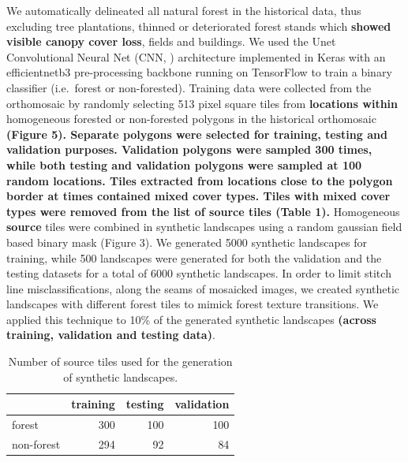 \documentclass[remote sensing,article,submit,moreauthors,pdftex]{mdpi}
\begin{document}
We automatically delineated all natural forest in the historical data,
thus excluding tree plantations, thinned or deteriorated forest stands
which \textbf{showed visible canopy cover loss}, fields and buildings.
We used the Unet Convolutional Neural Net (CNN, \citet{ronneberger2015})
architecture implemented in Keras \citep{chollet2015} with an
efficientnetb3 pre-processing backbone \citep{yakubovskiy2019} running
on TensorFlow \citep{martinabadi2015} to train a binary classifier
(i.e.~forest or non-forested). Training data were collected from the
orthomosaic by randomly selecting 513 pixel square tiles from
\textbf{locations within} homogeneous forested or non-forested polygons
in the historical orthomosaic \textbf{(Figure 5). Separate polygons were
selected for training, testing and validation purposes. Validation
polygons were sampled 300 times, while both testing and validation
polygons were sampled at 100 random locations. Tiles extracted from
locations close to the polygon border at times contained mixed cover
types. Tiles with mixed cover types were removed from the list of source
tiles (Table 1).} Homogeneous \textbf{source} tiles were combined in
synthetic landscapes using a random gaussian field based binary mask
(Figure 3). We generated 5000 synthetic landscapes for training, while
500 landscapes were generated for both the validation and the testing
datasets for a total of 6000 synthetic landscapes. In order to limit
stitch line misclassifications, along the seams of mosaicked images, we
created synthetic landscapes with different forest tiles to mimick
forest texture transitions. We applied this technique to 10\% of the
generated synthetic landscapes \textbf{(across training, validation and
testing data)}.

\begin{table}[!h]

\caption{\label{tab:unnamed-chunk-3}Number of source tiles used for the generation of synthetic landscapes.}
\centering
\begin{tabular}[t]{lrrr}
\toprule
  & training & testing & validation\\
\midrule
forest & 300 & 100 & 100\\
non-forest & 294 & 92 & 84\\
\bottomrule
\end{tabular}
\end{table}
\end{document}
